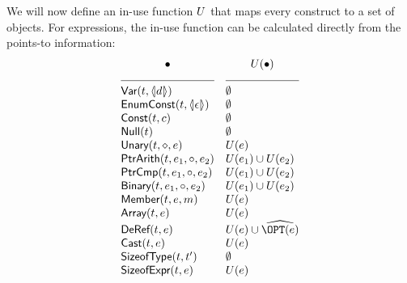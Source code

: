 \begin{docpart}
We will now define an in-use function $U$ that maps every \coreC
construct to a set of objects. For expressions, the in-use function
can be calculated directly from the points-to information:
\[
\begin{array}{ll}
  \hfil \bullet & \hfil \Use(\bullet) \\
  \hrulefill & \hrulefill \\
\cons{Var}(t,\coreXref d) & \emptyset \\
\cons{EnumConst}(t,\coreXref\epsilon) & \emptyset \\
\cons{Const}(t,c) & \emptyset \\
\cons{Null}(t) & \emptyset \\
\cons{Unary}(t,\diamond,e) & \Use(e) \\
\cons{PtrArith}(t,e_1,\circ,e_2) &  \Use(e_1) \cup \Use(e_2) \\
\cons{PtrCmp}(t,e_1,\circ,e_2) &  \Use(e_1) \cup \Use(e_2) \\
\cons{Binary}(t,e_1,\circ,e_2) &  \Use(e_1) \cup \Use(e_2) \\
\cons{Member}(t,e,m) &  \Use(e) \\
\cons{Array}(t,e) &  \Use(e) \\
\cons{DeRef}(t,e) &  \Use(e) \cup \subdecl{\OPT(e)} \\
\cons{Cast}(t,e) &  \Use(e) \\
\cons{SizeofType}(t,t') & \emptyset \\
\cons{SizeofExpr}(t,e) & \Use(e) \\
\end{array}
\]


\end{docpart}
